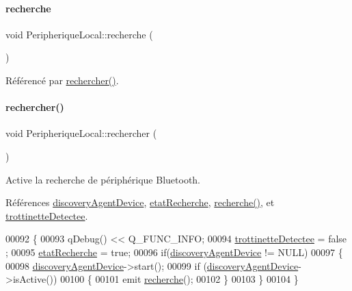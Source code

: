 \paragraph{\texorpdfstring{recherche}{recherche}}
{\footnotesize\ttfamily void Peripherique\+Local\+::recherche (\begin{DoxyParamCaption}{ }\end{DoxyParamCaption})\hspace{0.3cm}{\ttfamily [signal]}}



Référencé par \hyperlink{class_peripherique_local_aa3b12b1c122605cf00b8ab48ed4284c1}{rechercher()}.

\mbox{\label{class_peripherique_local_aa3b12b1c122605cf00b8ab48ed4284c1}} 
\paragraph{\texorpdfstring{rechercher()}{rechercher()}}
{\footnotesize\ttfamily void Peripherique\+Local\+::rechercher (\begin{DoxyParamCaption}{ }\end{DoxyParamCaption})}

Active la recherche de périphérique Bluetooth. 

Références \hyperlink{class_peripherique_local_a9e398b7dd89a20b1bee67b8c3467da69}{discovery\+Agent\+Device}, \hyperlink{class_peripherique_local_a6638c29f6f75c3b4d329d93ae6ea4a48}{etat\+Recherche}, \hyperlink{class_peripherique_local_a017f86e371bad418585d28b97557248a}{recherche()}, et \hyperlink{class_peripherique_local_af6f664b6af67f1c90eb017391ac812ed}{trottinette\+Detectee}.


\begin{DoxyCode}
00092 \{
00093     qDebug() << Q\_FUNC\_INFO;
00094     \hyperlink{class_peripherique_local_af6f664b6af67f1c90eb017391ac812ed}{trottinetteDetectee} = false ;
00095     \hyperlink{class_peripherique_local_a6638c29f6f75c3b4d329d93ae6ea4a48}{etatRecherche} = \textcolor{keyword}{true};
00096     \textcolor{keywordflow}{if}(\hyperlink{class_peripherique_local_a9e398b7dd89a20b1bee67b8c3467da69}{discoveryAgentDevice} != NULL)
00097     \{
00098         \hyperlink{class_peripherique_local_a9e398b7dd89a20b1bee67b8c3467da69}{discoveryAgentDevice}->start();
00099         \textcolor{keywordflow}{if} (\hyperlink{class_peripherique_local_a9e398b7dd89a20b1bee67b8c3467da69}{discoveryAgentDevice}->isActive())
00100         \{
00101             emit \hyperlink{class_peripherique_local_a017f86e371bad418585d28b97557248a}{recherche}();
00102         \}
00103     \}
00104 \}
\end{DoxyCode}
\mbox{\label{class_peripherique_local_a16add86080e72a5ce804ff9296e10415}} 
